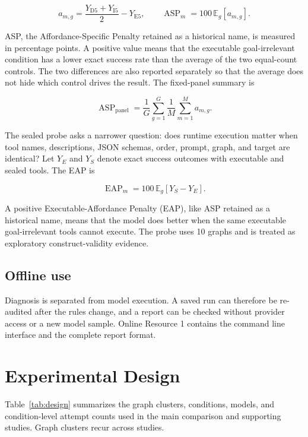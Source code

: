 \documentclass[pdflatex,sn-basic]{sn-jnl}
\begin{document}
\begin{equation}
a_{m,g}=\frac{Y_{\mathrm{D5}}+Y_{\mathrm{I5}}}{2}-Y_{\mathrm{E5}},
\qquad
\operatorname{ASP}_m
=100\,\mathbb{E}_g[a_{m,g}].
\label{eq:asp}
\end{equation}

ASP, the Affordance-Specific Penalty retained as a historical name, is measured
in percentage points. A positive value means that the
executable goal-irrelevant condition has a lower exact success rate than the average of the two
equal-count controls. The two differences are also reported separately so that
the average does not hide which control drives the result. The fixed-panel
summary is

\begin{equation}
\operatorname{ASP}_{\mathrm{panel}}
=\frac{1}{G}\sum_{g=1}^{G}\frac{1}{M}\sum_{m=1}^{M}a_{m,g}.
\label{eq:panel-asp}
\end{equation}

The sealed probe asks a narrower question: does runtime execution matter when
tool names, descriptions, JSON schemas, order, prompt, graph, and target are
identical? Let \(Y_E\) and \(Y_S\) denote exact success outcomes with executable and
sealed tools. The EAP is

\begin{equation}
\operatorname{EAP}_m
=100\,\mathbb{E}_g[Y_S-Y_E].
\label{eq:eap}
\end{equation}

A positive Executable-Affordance Penalty (EAP), like ASP retained as a historical
name, means that the model does better when the same executable goal-irrelevant
tools cannot execute. The probe uses 10 graphs and is treated as exploratory
construct-validity evidence.

\subsection{Offline use}

Diagnosis is separated from model execution. A saved run can therefore be
re-audited after the rules change, and a report can be checked without provider
access or a new model sample. Online Resource 1 contains the command
line interface and the complete report format.

\section{Experimental Design}

Table~\ref{tab:design} summarizes the graph clusters, conditions, models, and
condition-level attempt counts used in the main comparison and supporting
studies. Graph clusters recur across studies.
\end{document}

